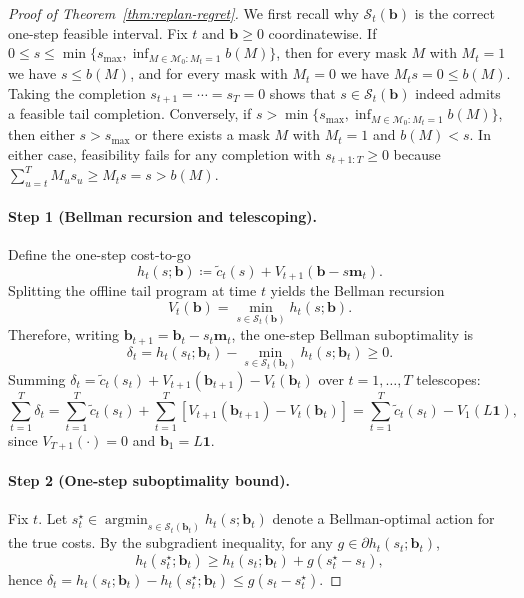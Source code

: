 \documentclass{uai2026} %
\newcommand{\1}{\mathbf{1}}
\newcommand{\scalt}{\mathcal{S}_{t}}
\newcommand{\mcal}{\mathcal{M}}
\newcommand{\argmin}{\operatorname*{argmin}}
\begin{document}
\begin{proof}[Proof of Theorem~\ref{thm:replan-regret}]
  We first recall why $\scalt(\mathbf{b})$ is the correct one-step feasible interval.
  Fix $t$ and $\mathbf{b}\ge 0$ coordinatewise.
  If $0\le s\le \min\{s_{\max},\inf_{M\in\mcal_{0}:M_t=1} b(M)\}$, then for every mask $M$ with $M_t=1$ we have $s\le b(M)$, and for every mask with $M_t=0$ we have $M_t s = 0\le b(M)$.
  Taking the completion $s_{t+1}=\cdots=s_T=0$ shows that $s\in\scalt(\mathbf{b})$ indeed admits a feasible tail completion.
  Conversely, if $s>\min\{s_{\max},\inf_{M\in\mcal_{0}:M_t=1} b(M)\}$, then either $s>s_{\max}$ or there exists a mask $M$ with $M_t=1$ and $b(M)<s$.
  In either case, feasibility fails for any completion with $s_{t+1:T}\ge 0$ because $\sum_{u=t}^{T} M_u s_u \ge M_t s = s > b(M)$.

  \paragraph{Step 1 (Bellman recursion and telescoping).}
  Define the one-step cost-to-go
  \begin{equation*}
    h_t(s;\mathbf{b})
    \coloneqq
    \tilde{c}_t(s)+V_{t+1}(\mathbf{b}-s\mathbf{m}_t).
  \end{equation*}
  Splitting the offline tail program at time $t$ yields the Bellman recursion
  \begin{equation*}
    V_t(\mathbf{b})=\min_{s\in\scalt(\mathbf{b})} h_t(s;\mathbf{b}).
  \end{equation*}
  Therefore, writing $\mathbf{b}_{t+1}=\mathbf{b}_t-s_t\mathbf{m}_t$, the one-step Bellman suboptimality is
  \begin{equation*}
    \delta_t
    =
    h_t(s_t;\mathbf{b}_t)-\min_{s\in\scalt(\mathbf{b}_t)}h_t(s;\mathbf{b}_t)
    \ge 0.
  \end{equation*}
  Summing $\delta_t=\tilde{c}_t(s_t)+V_{t+1}(\mathbf{b}_{t+1})-V_t(\mathbf{b}_t)$ over $t=1,\dots,T$ telescopes:
  \begin{equation*}
    \sum_{t=1}^{T}\delta_t
    =
    \sum_{t=1}^{T}\tilde{c}_t(s_t)
    +
    \sum_{t=1}^{T}\left[V_{t+1}(\mathbf{b}_{t+1})-V_t(\mathbf{b}_t)\right]
    =
    \sum_{t=1}^{T}\tilde{c}_t(s_t)-V_1(L\1),
  \end{equation*}
  since $V_{T+1}(\cdot)=0$ and $\mathbf{b}_1=L\1$.

  \paragraph{Step 2 (One-step suboptimality bound).}
  Fix $t$.
  Let $s_t^{\star}\in\argmin_{s\in\scalt(\mathbf{b}_t)}h_t(s;\mathbf{b}_t)$ denote a Bellman-optimal action for the true costs.
  By the subgradient inequality, for any $g\in\partial h_t(s_t;\mathbf{b}_t)$,
  \begin{equation*}
    h_t(s_t^{\star};\mathbf{b}_t)\ge h_t(s_t;\mathbf{b}_t)+g(s_t^{\star}-s_t),
  \end{equation*}
  hence $\delta_t=h_t(s_t;\mathbf{b}_t)-h_t(s_t^{\star};\mathbf{b}_t)\le g(s_t-s_t^{\star})$.


\end{proof}
\end{document}
